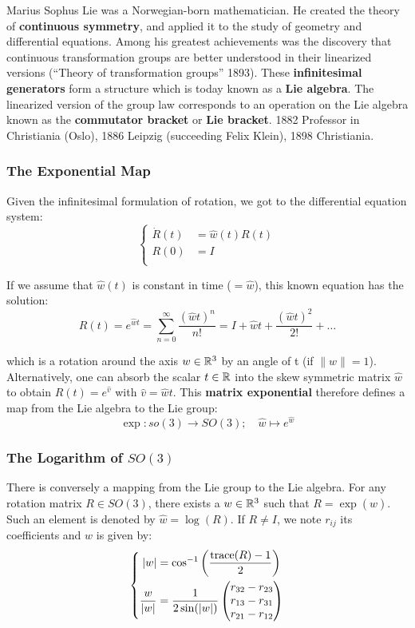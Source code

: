 Marius Sophus Lie was a Norwegian-born mathematician.
He created the theory of \textbf{continuous symmetry}, and applied it to
the study of geometry and differential equations. Among his greatest
achievements was the discovery that continuous transformation
groups are better understood in their linearized versions
(``Theory of transformation groups'' 1893).
These \textbf{infinitesimal generators} form a structure which is today
known as a \textbf{Lie algebra}. The linearized version of the group law
corresponds to an operation on the Lie algebra known as
the \textbf{commutator bracket} or \textbf{Lie bracket}.
1882 Professor in Christiania (Oslo),
1886 Leipzig (succeeding Felix Klein),
1898 Christiania.


\subsubsection{The Exponential Map}%
\label{ssub:the_exponential_map}

Given the infinitesimal formulation of rotation,
we got to the differential equation system:
	\[\left\{ \begin{aligned}
		\dot{R}(t) &= \widehat{w}(t)R(t) \\
		R(0) &= I \\
	\end{aligned}\right.\]

If we assume that $\widehat{w}(t)$ is constant in time ($=\widehat{w}$),
this known equation has the solution:
	\[R(t) = e^{\widehat{w}t}
		= \sum_{n=0}^{\infty} \frac{{(\widehat{w}t)}^n }{n!}
		= I + \widehat{w}t + \frac{{(\widehat{w}t)}^2 }{2!} + \ldots \]

which is a rotation around the axis $w \in \mathbb{R}^3$
by an angle of t (if $\|w\| = 1$). Alternatively, one can absorb
the scalar $t \in \mathbb{R}$ into the skew  symmetric matrix $\widehat{w}$
to obtain $R(t) = e^{\widehat{v}}$ with $\widehat{v} = \widehat{w}t$.
This \textbf{matrix exponential} therefore defines a map from
the Lie algebra to the Lie group:
	\[\exp : so(3) \rightarrow SO(3);\quad \widehat{w}\mapsto e^{\widehat{w}}\]


\subsubsection{The Logarithm of $SO(3)$}%
\label{ssub:the_logarithm_of_so_3_}

There is conversely a mapping from the Lie group to the Lie algebra.
For any rotation matrix $R \in SO(3)$, there exists a $w \in \mathbb{R}^3$
such that $R = \exp(\widehat{w})$. Such an element is denoted by
$\widehat{w} = \log(R)$. If $R \ne I$, we note $r_{ij}$ its coefficients
and $w$ is given by:
	\[\left\{ \begin{aligned}
		|w| &= \cos^{-1}\left(\frac{\text{trace}(R)-1}{2}\right)\\
		\frac{w}{|w|} &= \frac{1}{2\sin(|w|)}
			\begin{pmatrix}
				r_{32} - r_{23} \\
				r_{13} - r_{31} \\
				r_{21} - r_{12} \\
			\end{pmatrix}
	\end{aligned}\right.\]

